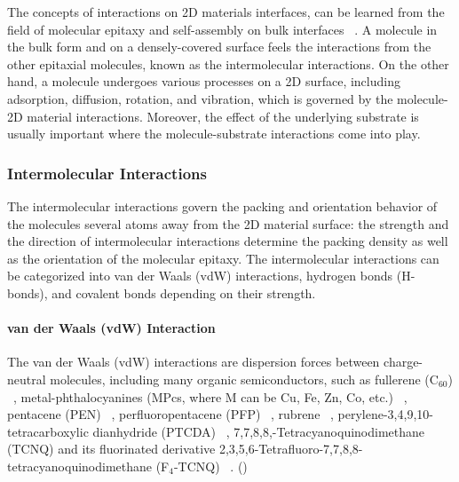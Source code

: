 The concepts of interactions on 2D materials interfaces, can be
learned from the field of molecular epitaxy and self-assembly on bulk
interfaces
~\cite{Kowarik_2008_rev_MBE,Barth_2007,Whitesides_2002_assem_rev,Philips_2D_assem_book}.
% 
A molecule in the bulk
form and on a densely-covered surface feels the interactions from the
other epitaxial molecules, known as the intermolecular
interactions. On the other hand, a molecule undergoes various
processes on a 2D surface, including adsorption, diffusion, rotation,
and vibration, which is governed by the molecule-2D material
interactions. Moreover, the effect of the underlying substrate is
usually important where the molecule-substrate interactions come into
play. 

\subsubsection{Intermolecular Interactions}
\label{sec:intro-inter-mole}

The intermolecular interactions govern the packing and orientation
behavior of the molecules several atoms away from the 2D material
surface: the strength and the direction of intermolecular interactions
determine the packing density as well as the orientation of the
molecular epitaxy. The intermolecular interactions can be categorized 
into van der Waals (vdW) interactions, hydrogen bonds (H-bonds), and
covalent bonds depending on their strength. 

\paragraph{van der Waals (vdW) Interaction}

The van der Waals (vdW) interactions are dispersion forces between
charge-neutral molecules, including many organic semiconductors, such
as fullerene (C\(_{\text{60}}\))
~\cite{Corso_2004_C60_hBN,Kim_2015_c60_gr,Chen_2016_c60_mos2},
metal-phthalo\-cyanines (MPcs, where M can be Cu, Fe, Zn, Co, etc.)
~\cite{Xiao_2013_jacs_CuPc_gr,Wang_2010_selec_F16_gr,Zhang_2011_FePc_gr,Hamalainen_2012_CoPc_gr_Ir,Ying_Mao_2011_ge_clAlPc,Ogawa_2013_AlCiPc_gr,Pak_2015_CuPc_MoS2,Avvisati_2017_FePc_intercal,Iannuzzi_2014_MPc_hBN_Rh},
pentacene (PEN)
~\cite{Lee_2011_pentacene,Jariwala_2016_Mos2_pentacene,Shen_2017_DFT_mos2_pent,Kim_2016_trap_Mos2_pent,Nguyen_2015_pent_gr_wett,Betti_2007_orien_pentacene},
perfluoropentacene (PFP)
~\cite{Salzmann_2012_fpen_gr,Breuer_2016_acnene_mos2}, rubrene
~\cite{Lee_2014_rubene_hBN}, perylene-3,4,9,10-tetra\-carboxylic
dianhydride (PTCDA)
~\cite{Wang_2009_STM_PTCDA_Gr,Tian_2010_PTCDA_gr,Huang_2009_PTCDA_gr,Meissner_2012_PTCDA_BLG},
7,7,8,8,-Tetra\-cyanoquino\-dimethane (TCNQ) and its fluorinated
derivative 2,3,5,6-Tetra\-fluoro-7,7,8,8-tetra\-cyanoquino\-dimethane
(F\(_{\text{4}}\)-TCNQ)
~\cite{Chen_2007_TCNQ_gr,Hong_2013_ftcnq_gr,Stradi_2014_TCNQ_gr_Ru,Tsai_2015_TCNQ_gr_hbn}.
()

